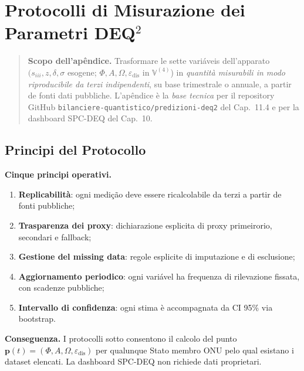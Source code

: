 \chapter{Protocolli di Misurazione dei Parametri
DEQ$^2$}\label{protocolli-di-medição-dei-parâmetros-dequxb2}

\begin{quote}
\textbf{Scopo dell'apêndice.} Trasformare le sette variáveis
dell'apparato \((s_{iii}, z, \delta, \sigma\) esogene;
\(\Phi, A, \Omega, \varepsilon_{\text{dis}}\) in \(\mathbb{V}^{(4)}\))
in \emph{quantità misurabili in modo riproducibile da terzi
indipendenti}, su base trimestrale o annuale, a partir de fonti dati
pubbliche. L'apêndice è la \emph{base tecnica} per il repository GitHub
\texttt{bilanciere-quantistico/predizioni-deq2} del Cap.~11.4 e per la
dashboard SPC-DEQ del Cap.~10.
\end{quote}



\section{Principi del Protocollo}\label{principi-del-protocollo}

\Hypoth{} \textbf{Cinque principi operativi.}

\begin{enumerate}
\def\labelenumi{\arabic{enumi}.}
\tightlist
\item
  \textbf{Replicabilità}: ogni medição deve essere ricalcolabile da
  terzi a partir de fonti pubbliche;
\item
  \textbf{Trasparenza dei proxy}: dichiarazione esplicita di proxy
  primeirorio, secondari e fallback;
\item
  \textbf{Gestione del missing data}: regole esplicite di imputazione e
  di esclusione;
\item
  \textbf{Aggiornamento periodico}: ogni variável ha frequenza di
  rilevazione fissata, con scadenze pubbliche;
\item
  \textbf{Intervallo di confidenza}: ogni stima è accompagnata da CI
  95\% via bootstrap.
\end{enumerate}

\Proved{} \textbf{Conseguenza.} I protocolli sotto consentono il calcolo
del punto
\(\boldsymbol{p}(t) = (\Phi, A, \Omega, \varepsilon_{\text{dis}})\) per
qualunque Stato membro ONU pelo qual esistano i dataset elencati. La
dashboard SPC-DEQ non richiede dati proprietari.



